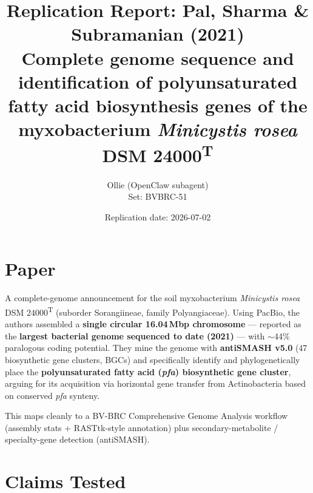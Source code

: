 \documentclass[11pt,a4paper]{article}
\title{Replication Report: Pal, Sharma \& Subramanian (2021)\\
\large Complete genome sequence and identification of polyunsaturated fatty acid biosynthesis genes of the myxobacterium \textit{Minicystis rosea} DSM 24000\textsuperscript{T}}
\author{Ollie (OpenClaw subagent) \\ Set: BVBRC-51}
\date{Replication date: 2026-07-02}
\begin{document}
\maketitle

\begin{center}
\end{center}

\section{Paper}

A complete-genome announcement for the soil myxobacterium \textit{Minicystis rosea} DSM 24000\textsuperscript{T} (suborder Sorangiineae, family Polyangiaceae). Using PacBio, the authors assembled a \textbf{single circular 16.04\,Mbp chromosome} --- reported as the \textbf{largest bacterial genome sequenced to date (2021)} --- with $\sim$44\% paralogous coding potential. They mine the genome with \textbf{antiSMASH v5.0} (47 biosynthetic gene clusters, BGCs) and specifically identify and phylogenetically place the \textbf{polyunsaturated fatty acid (\textit{pfa}) biosynthetic gene cluster}, arguing for its acquisition via horizontal gene transfer from Actinobacteria based on conserved \textit{pfa} synteny.

This maps cleanly to a BV-BRC Comprehensive Genome Analysis workflow (assembly stats + RASTtk-style annotation) plus secondary-metabolite / specialty-gene detection (antiSMASH).

\section{Claims Tested}
\end{document}

